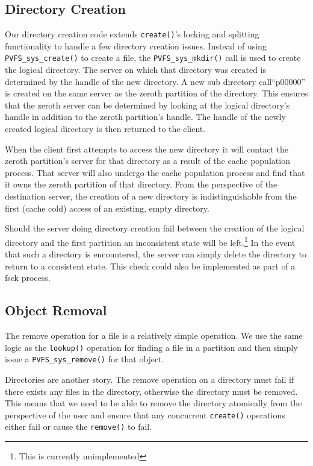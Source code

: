 \documentclass[twocolumn,letterpaper]{article}
\newcommand{\code}[1]{\texttt{#1}}
\begin{document}
\subsection{Directory Creation}
Our directory creation code extends \code{create()}'s locking and splitting
functionality to handle a few directory creation issues.  Instead of using
\code{PVFS\_\-sys\_\-create()} to create a file, the \code{PVFS\_\-sys\_\-mkdir()} call is
used to create the logical directory.  The server on which that directory was
created is determined by the handle of the new directory.  A new sub directory
call``p00000'' is created on the same server as the zeroth partition of the
directory.  This ensures that the zeroth server can be determined by looking
at the logical directory's handle in addition to the zeroth partition's handle.
The handle of the newly created logical directory is then returned to the client.

When the client first attempts to access the new directory it will contact the
zeroth partition's server for that directory as a result of the cache
population process.  That server will also undergo the cache population
process and find that it owns the zeroth partition of that directory.  From
the perspective of the destination server, the creation of a new directory is
indistinguishable from the first (cache cold) access of an existing, empty
directory.

Should the server doing directory creation fail between the creation of the
logical directory and the first partition an inconsistent state will be
left.\footnote{This is currently unimplemented}  In the event that such a
directory is encountered, the server can simply delete the directory to return
to a consistent state.  This check could also be implemented as part of a fsck
process.

\subsection{Object Removal}
The remove operation for a file is a relatively simple operation.  We use the
same logic as the \code{lookup()} operation for finding a file in a partition
and then simply issue a \code{PVFS\_\-sys\_\-remove()} for that object.

Directories are another story.  The remove operation on a directory must fail if
there exists any files in the directory, otherwise the directory must be
removed.  This means that we need to be able to remove the directory
atomically from the perspective of the user and ensure that any concurrent
\code{create()} operations either fail or cause the \code{remove()} to fail.
\end{document}
